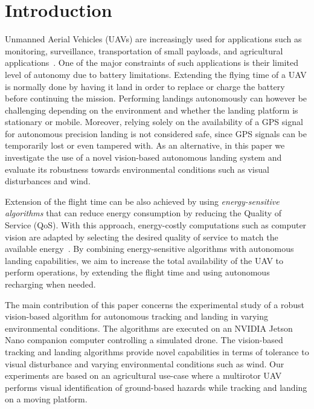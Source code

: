 \documentclass[conference]{IEEEtran}
\begin{document}
\section{Introduction}
\label{sec:introduction}

Unmanned Aerial Vehicles (UAVs) are increasingly used for applications
such as monitoring, surveillance, transportation of small payloads,
and agricultural applications~\cite{costa2012use,salami2014uav}.
%
One of the major constraints of such applications is their limited level of autonomy due to battery limitations.
Extending the flying time of a UAV is normally done by having it land
in order to replace or charge the battery before continuing the
mission. Performing landings autonomously can however be challenging
depending on the environment and whether the landing platform is
stationary or mobile. Moreover, relying solely on the availability of a GPS signal for
autonomous precision landing is not considered safe, since GPS signals
can be temporarily lost or even tampered with. As an alternative, in this paper we investigate the use of a novel
vision-based autonomous landing system and evaluate its robustness
towards environmental conditions such as visual disturbances and wind.

Extension of the flight time can be also achieved by using
\emph{energy-sensitive algorithms} that can reduce energy consumption
by reducing the Quality of Service (QoS). With this approach,
energy-costly computations such as computer vision are adapted by
selecting the desired quality of service to match the available
energy~\cite{seewald2020mechanical}. By combining energy-sensitive algorithms with autonomous landing
capabilities, we aim to increase the total availability of the UAV to
perform operations, by extending the flight time and using autonomous
recharging when needed.

The main contribution of this paper concerns the experimental study of
a robust vision-based algorithm for autonomous
tracking and landing in varying environmental conditions. The
algorithms are executed on an NVIDIA Jetson Nano companion computer
controlling a simulated drone. The vision-based tracking and landing
algorithms provide novel capabilities in terms of tolerance to visual
disturbance and varying environmental conditions such as wind.
%
Our experiments are based on an agricultural use-case where a
multirotor UAV performs visual identification of ground-based hazards
while tracking and landing on a moving platform.
%
\end{document}
